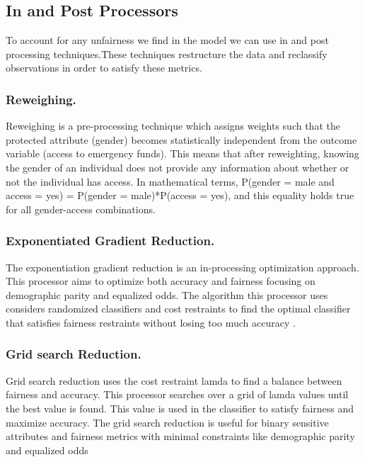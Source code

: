 \documentclass[water,article,submit,moreauthors,pdftex]{mdpi}
\begin{document}
\hypertarget{in-and-post-processors}{%
\subsection{In and Post Processors}\label{in-and-post-processors}}

To account for any unfairness we find in the model we can use in and
post processing techniques.These techniques restructure the data and
reclassify observations in order to satisfy these metrics.

\hypertarget{reweighing.}{%
\subsubsection{Reweighing.}\label{reweighing.}}

Reweighing is a pre-processing technique which assigns weights such that
the protected attribute (gender) becomes statistically independent from
the outcome variable (access to emergency funds). This means that after
reweighting, knowing the gender of an individual does not provide any
information about whether or not the individual has access. In
mathematical terms, P(gender = male and access = yes) = P(gender =
male)*P(access = yes), and this equality holds true for all
gender-access combinations.

\hypertarget{exponentiated-gradient-reduction.}{%
\subsubsection{Exponentiated Gradient
Reduction.}\label{exponentiated-gradient-reduction.}}

The exponentiation gradient reduction is an in-processing optimization
approach. This processor aims to optimize both accuracy and fairness
focusing on demographic parity and equalized odds. The algorithm this
processor uses considers randomized classifiers and cost restraints to
find the optimal classifier that satisfies fairness restraints without
losing too much accuracy \citep{agarwal2018reductions}.

\hypertarget{grid-search-reduction.}{%
\subsubsection{Grid search Reduction.}\label{grid-search-reduction.}}

Grid search reduction uses the cost restraint lamda to find a balance
between fairness and accuracy. This processor searches over a grid of
lamda values until the best value is found. This value is used in the
classifier to satisfy fairness and maximize accuracy. The grid search
reduction is useful for binary sensitive attributes and fairness metrics
with minimal constraints like demographic parity and equalized odds
\citep{agarwal2018reductions, agarwal2019fair}
\end{document}
